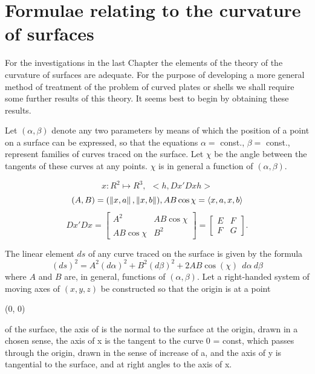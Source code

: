 
\section{Formulae relating to the curvature of surfaces}
For the investigations in the last Chapter the elements of the theory of
the curvature of surfaces are adequate. For the purpose of developing a
more general method of treatment of the problem of curved plates or shells
we shall require some further results of this theory. It seems best to
begin by obtaining these results.

Let \((\alpha ,\beta) \)
denote any two parameters by means of which the position of
a point on a surface can be expressed, so that the equations
\(\alpha=\) const.,
\(\beta=\) const., represent families of curves traced on the surface. Let
\(\chi \) be the angle between the tangents of these curves at any points.
\(\chi \) is in general
a function of
\((\alpha ,\beta) \).

\[ x : R^2 \mapsto R^3,  ~~ < h, Dx' Dx h> \]
\[ (A,B) = (\left\lVert x,a\right\rVert,\left\lVert x,b\right\rVert), A B \cos \chi =   \langle x,a , x,b \rangle \]
\[
Dx' Dx  =
\begin{bmatrix}
A^2  &  AB \cos \chi \\
AB \cos \chi & B^2
\end{bmatrix} =
\begin{bmatrix}
E & F \\
F & G
\end{bmatrix}.
\]


The linear element \(ds\) of any curve traced on the surface is given by the formula
\begin{equation}\label{eq1}
 {(ds)}^2 = A^2 {(d \alpha)}^2   + B^2 {(d \beta)}^2 + 2AB \cos (\chi) ~~ d \alpha ~  d \beta
\end{equation}
where \(A\) and \(B\) are, in general, functions of
\((\alpha ,\beta)\). Let a right-handed system
of moving axes of \( (x, y, z) \)
be constructed so that the origin is at a point

 (0, 0)


of the surface, the axis of  is the normal to the surface at the origin, drawn
in a chosen sense, the axis of
x is the tangent to the curve
0 = const, which
passes through the origin, drawn in the sense of increase of
a, and the axis of
y is tangential to the surface, and at right angles to the axis of
x.

